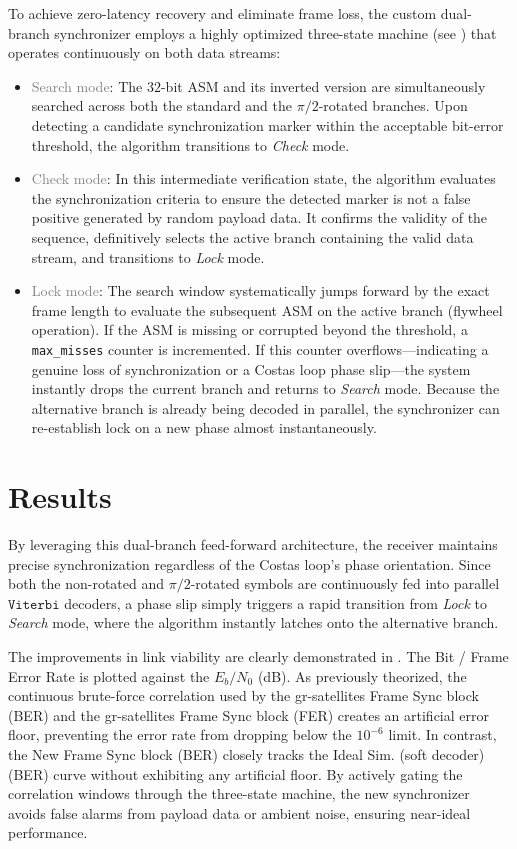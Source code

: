 To achieve zero-latency recovery and eliminate frame loss, the custom dual-branch synchronizer employs a highly optimized three-state machine (see ) that operates continuously on both data streams:

\begin{itemize}
    \item \textcolor{gray}{Search mode}: The $32$-bit ASM and its inverted version are simultaneously searched across both the standard and the $\pi/2$-rotated branches. Upon detecting a candidate synchronization marker within the acceptable bit-error threshold, the algorithm transitions to \textit{Check} mode.
    \item \textcolor{gray}{Check mode}: In this intermediate verification state, the algorithm evaluates the synchronization criteria to ensure the detected marker is not a false positive generated by random payload data. It confirms the validity of the sequence, definitively selects the active branch containing the valid data stream, and transitions to \textit{Lock} mode.
    \item \textcolor{gray}{Lock mode}: The search window systematically jumps forward by the exact frame length to evaluate the subsequent ASM on the active branch (flywheel operation). If the ASM is missing or corrupted beyond the threshold, a \texttt{max\_misses} counter is incremented. If this counter overflows—indicating a genuine loss of synchronization or a Costas loop phase slip—the system instantly drops the current branch and returns to \textit{Search} mode. Because the alternative branch is already being decoded in parallel, the synchronizer can re-establish lock on a new phase almost instantaneously.
\end{itemize}


\section{Results}

By leveraging this dual-branch feed-forward architecture, the receiver maintains precise synchronization regardless of the Costas loop's phase orientation. Since both the non-rotated and $\pi/2$-rotated symbols are continuously fed into parallel $\mathtt{Viterbi}$ decoders, a phase slip simply triggers a rapid transition from \textit{Lock} to \textit{Search} mode, where the algorithm instantly latches onto the alternative branch. 

The improvements in link viability are clearly demonstrated in . The Bit / Frame Error Rate is plotted against the $E_{b}/N_{0}$ (dB). As previously theorized, the continuous brute-force correlation used by the gr-satellites Frame Sync block (BER) and the gr-satellites Frame Sync block (FER) creates an artificial error floor, preventing the error rate from dropping below the $10^{-6}$ limit. In contrast, the New Frame Sync block (BER) closely tracks the Ideal Sim. (soft decoder) (BER) curve without exhibiting any artificial floor. By actively gating the correlation windows through the three-state machine, the new synchronizer avoids false alarms from payload data or ambient noise, ensuring near-ideal performance.


